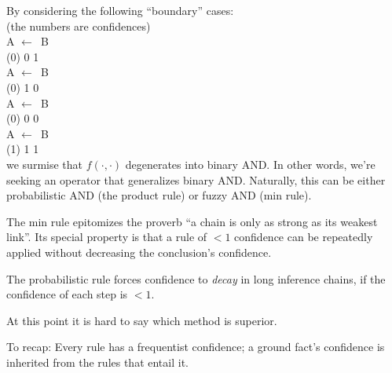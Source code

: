 By considering the following ``boundary'' cases:\\
(the numbers are confidences)\\
\hspace*{1cm} A $\leftarrow$\textemdash\textemdash\textemdash\textemdash\textemdash $\,$ B\\
\hspace*{1cm} (0) \hspace*{0.8cm} 0 \hspace*{0.8cm} 1\\
\hspace*{1cm} A $\leftarrow$\textemdash\textemdash\textemdash\textemdash\textemdash $\,$ B\\
\hspace*{1cm} (0) \hspace*{0.8cm} 1 \hspace*{0.8cm} 0 \\
\hspace*{1cm} A $\leftarrow$\textemdash\textemdash\textemdash\textemdash\textemdash $\,$ B\\
\hspace*{1cm} (0) \hspace*{0.8cm} 0 \hspace*{0.8cm} 0 \\
\hspace*{1cm} A $\leftarrow$\textemdash\textemdash\textemdash\textemdash\textemdash $\,$ B\\
\hspace*{1cm} (1) \hspace*{0.8cm} 1 \hspace*{0.8cm} 1\\
we surmise that $f(\cdot,\cdot)$ degenerates into binary AND.  In other words, we're seeking an operator that generalizes binary AND.  Naturally, this can be either probabilistic AND (the product rule) or fuzzy AND (min rule).

The min rule epitomizes the proverb ``a chain is only as strong as its weakest link''.  Its special property is that a rule of $< 1$ confidence can be repeatedly applied without decreasing the conclusion's confidence.

The probabilistic rule forces confidence to \textit{decay} in long inference chains, if the confidence of each step is $< 1$.

At this point it is hard to say which method is superior.

To recap:  Every rule has a frequentist confidence;  a ground fact's confidence is inherited from the rules that entail it.

